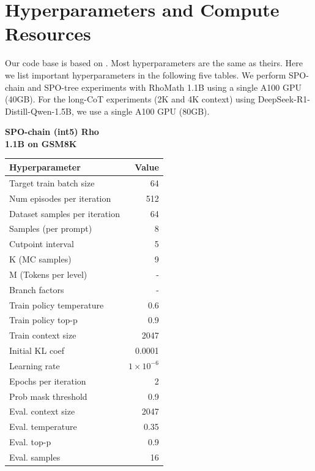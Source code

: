 \section{Hyperparameters and Compute Resources}
\label{appendix:hyperparameter}

Our code base is based on \cite{kazemnejad2024vineppounlockingrlpotential}. Most hyperparameters are the same as theirs. Here we list important hyperparameters in the following five tables. We perform SPO-chain and SPO-tree experiments with RhoMath 1.1B using a single A100 GPU (40GB). For the long-CoT experiments (2K and 4K context) using DeepSeek-R1-Distill-Qwen-1.5B, we use a single A100 GPU (80GB).

\begin{minipage}[t]{0.48\textwidth}
    \centering
    \textbf{SPO-chain (int5) Rho \\ 1.1B on GSM8K}\\[4pt]
    \begin{tabular}{@{}lr@{}}
        \toprule
        Hyperparameter & Value \\ \midrule
        Target train batch size & 64 \\ 
        Num episodes per iteration & 512 \\ 
        Dataset samples per iteration & 64 \\
        Samples (per prompt) & 8 \\
        Cutpoint interval & 5 \\
        K (MC samples) & 9 \\
        M (Tokens per level) & - \\
        Branch factors & - \\
        Train policy temperature & 0.6 \\
        Train policy top-p & 0.9 \\
        Train context size & 2047 \\
        Initial KL coef & 0.0001 \\
        Learning rate & $1\times10^{-6}$ \\
        Epochs per iteration & 2 \\
        Prob mask threshold & 0.9 \\
        Eval. context size & 2047\\
        Eval. temperature & 0.35 \\
        Eval. top-p & 0.9 \\
        Eval. samples & 16 \\
        \bottomrule
    \end{tabular}
\end{minipage}\hfill

